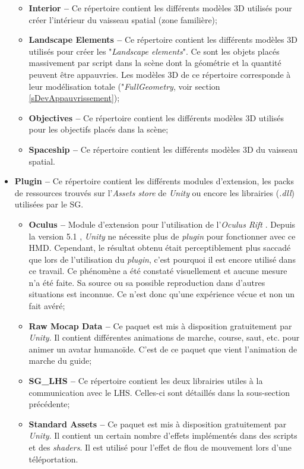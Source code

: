 \begin{itemize}
\begin{itemize}
				\item \textbf{Interior --} Ce répertoire contient les différents modèles 3D utilisés pour créer l'intérieur du vaisseau spatial (zone familière);
				\item \textbf{Landscape Elements --} Ce répertoire contient les différents modèles 3D utilisés pour créer les "\textit{Landscape elements}". Ce sont les objets placés massivement par script dans la scène dont la géométrie et la quantité peuvent être appauvries. Les modèles 3D de ce répertoire corresponde à leur modélisation totale ("\textit{FullGeometry}, voir section \ref{sDevAppauvrissement});			
				\item \textbf{Objectives --} Ce répertoire contient les différents modèles 3D utilisés pour les objectifs placés dans la scène;			
				\item \textbf{Spaceship --} Ce répertoire contient les différents modèles 3D du vaisseau spatial.	
			\end{itemize}
			\item \textbf{Plugin --} Ce répertoire contient les différents modules d'extension, les packs de ressources trouvés sur l'\textit{Assets store} \cite{UnityAssetStore_website} de \textit{Unity} ou encore les librairies (\textit{.dll}) utilisées par le SG.
			\begin{itemize}
				\item \textbf{Oculus --} Module d'extension pour l'utilisation de l'\textit{Oculus Rift} \cite{OculusDk2_website}. Depuis la version 5.1 \cite{UnityOculusIntegration}, \textit{Unity} ne nécessite plus de \textit{plugin} pour fonctionner avec ce HMD. Cependant, le résultat obtenu était perceptiblement plus saccadé que lors de l'utilisation du \textit{plugin}, c'est pourquoi il est encore utilisé dans ce travail. Ce phénomène a été constaté visuellement et aucune mesure n'a été faite. Sa source ou sa possible reproduction dans d'autres situations est inconnue. Ce n'est donc qu'une expérience vécue et non un fait avéré; %
				\item \textbf{Raw Mocap Data --} Ce paquet est mis à disposition gratuitement par \textit{Unity}. Il contient différentes animations de marche, course, saut, etc. pour animer un avatar humanoïde. C'est de ce paquet que vient l'animation de marche du guide;
				\item \textbf{SG\_LHS --} Ce répertoire contient les deux librairies utiles à la communication avec le LHS. Celles-ci sont détaillés dans la sous-section précédente;
				\item \textbf{Standard Assets --} Ce paquet est mis à disposition gratuitement par \textit{Unity}. Il contient un certain nombre d'effets implémentés dans des scripts et des \textit{shaders}. Il est utilisé pour l'effet de flou de mouvement lors d'une téléportation.

\end{itemize}
\end{itemize}
